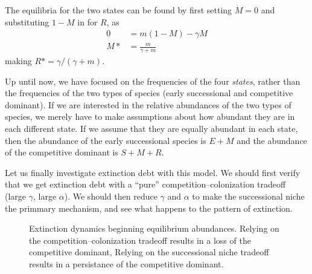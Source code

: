 The equilibria for the two states can be found by first setting $\dot{M}=0$ and substituting $1-M$ in for $R$, as 
\begin{align*}
  0 &= m\left(1-M\right) - \gamma M\\
  M* &= \frac{m}{\gamma + m}
\end{align*}
making $R* = \gamma/(\gamma+m)$. 


Up until now, we have focused on the frequencies of the four \emph{states}, rather than the frequencies of the two types of species (early successional and competitive dominant). If we are interested in the relative abundances of the two types of species, we merely have to make assumptions about how abundant they are in each different state. If we assume that they are equally abundant in each state, then the abundance of the early successional species is $E+M$ and the abundance of the competitive dominant is $S+M+R$.

Let us finally investigate extinction debt with this model. We should first verify that we get extinction debt with a ``pure'' competition--colonization tradeoff (large $\gamma$, large $\alpha$). We should then reduce $\gamma$ and $\alpha$ to make the successional niche the primmary mechanism, and see what happens to the pattern of extinction.


\begin{figure}[ht]
  \centering
  \caption[Dynamics of a successional community]{Extinction dynamics beginning equilibrium abundances.  Relying on the competition--colonization tradeoff results in a loss of the competitive dominant,   Relying on the successional niche tradeoff results in a persistance of the competitive dominant.}
  \label{fig:EDSN}
\end{figure}

